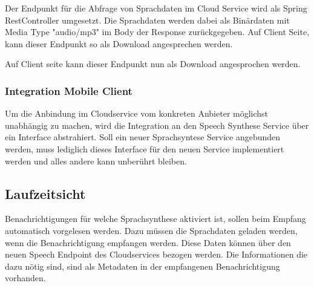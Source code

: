 Der Endpunkt für die Abfrage von Sprachdaten im Cloud Service wird als Spring RestController umgesetzt.
Die Sprachdaten werden dabei als Binärdaten mit Media Type "audio/mp3" im Body der Response zurückgegeben.
Auf Client Seite, kann dieser Endpunkt so als Download angesprechen werden.



Auf Client seite kann dieser Endpunkt nun als Download angesprochen werden.

\subsubsection{Integration Mobile Client }



Um die Anbindung im Cloudservice vom konkreten Anbieter möglichst unabhängig zu machen, wird die Integration an den Speech Synthese Service über ein Interface abstrahiert.
Soll ein neuer Sprachsyntese Service angebunden werden, muss lediglich dieses Interface für den neuen Service implementiert werden und alles andere kann unberührt bleiben.

\clearpage

\subsection*{Laufzeitsicht}

Benachrichtigungen für welche Sprachsynthese aktiviert ist, sollen beim Empfang automatisch vorgelesen werden.
Dazu müssen die Sprachdaten geladen werden, wenn die Benachrichtigung empfangen werden.
Diese Daten können über den neuen Speech Endpoint des Cloudservices bezogen werden.
Die Informationen die dazu nötig sind, sind als Metadaten in der empfangenen Benachrichtigung vorhanden.

